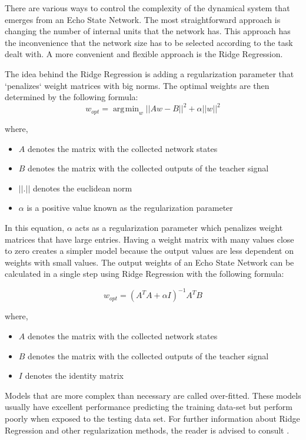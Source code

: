 \documentclass[letterpaper,9pt]{article}
\newcommand{\vectornorm}[1]{\left|\left|#1\right|\right|}
\DeclareMathOperator*{\argmin}{\arg\!\min}
\begin{document}
There are various ways to control the complexity of the dynamical system that emerges from an Echo State Network. The most straightforward approach is changing the number of internal units that the network has. This approach has the inconvenience that the network size has to be selected according to the task dealt with. A more convenient and flexible approach is the Ridge Regression.\pagebreak

The idea behind the Ridge Regression is adding a regularization parameter that `penalizes` weight matrices with big norms. The optimal weights are then determined by the following formula:
\[
w_{opt} = \argmin_{w} \vectornorm{Aw-B}^2 + \alpha \vectornorm{w}^2
\]

where,
\begin{itemize}
\item $A$ denotes the matrix with the collected network states
\item $B$ denotes the matrix with the collected outputs of the teacher signal
\item $\vectornorm{.}$ denotes the euclidean norm
\item $\alpha$ is a positive value known as the regularization parameter
\end{itemize}

In this equation, $\alpha$ acts as a regularization parameter which penalizes weight matrices that have large entries. Having a weight matrix with many values close to zero creates a simpler model because the output values are less dependent on weights with small values. The output weights of an Echo State Network can be calculated in a single step using Ridge Regression with the following formula:

\[
w_{opt} = (A^TA+\alpha I)^{-1}A^TB
\]

where,
\begin{itemize}
\item $A$ denotes the matrix with the collected network states
\item $B$ denotes the matrix with the collected outputs of the teacher signal
\item $I$ denotes the identity matrix
\end{itemize}

Models that are more complex than necessary are called over-fitted. These models usually have excellent performance predicting the training data-set but perform poorly when exposed to the testing data set. For further information about Ridge Regression and other regularization methods, the reader is advised to consult \cite{ESNVerstraeten}.
\end{document}
